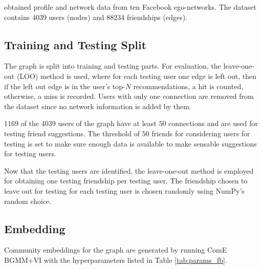 \documentclass[conference]{IEEEtran}
\begin{document}
\citeauthor{social_circles_in_ego_networks} obtained profile and network data from ten Facebook ego-networks. The dataset contains 4039 users (nodes) and 88234 friendships (edges).

\subsection{Training and Testing Split}

The \citet{social_circles_fb} graph is split into training and testing parts. For evaluation, the leave-one-out (LOO) method is used, where for each testing user one edge is left out, then if the left out edge is in the user's top-$N$ recommendations, a hit is counted, otherwise, a miss is recorded.
Users with only one connection are removed from the dataset since no network information is added by them.

$1169$ of the 4039 users of the \citet{social_circles_fb} graph have at least $50$ connections and are used for testing friend suggestions. The threshold of $50$ friends for considering users for testing is set to make sure enough data is available to make sensable suggestions for testing users.

Now that the testing users are identified, the leave-one-out method is employed for obtaining one testing friendship per testing user. The friendship chosen to leave out for testing for each testing user is chosen randomly using NumPy's random choice.\cite{oliphant2006guide, van2011numpy}

\subsection{Embedding}

Community embeddings for the \citet{social_circles_fb} graph are generated by running ComE BGMM+VI with the hyperparameters listed in Table \ref{tab:params_fb}.
\end{document}
